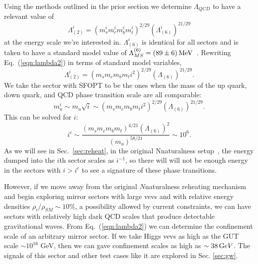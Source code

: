 \documentclass[nofootinbib,twocolumn,preprintnumbers]{revtex4-1}
\begin{document}
Using the methods outlined in the prior section we determine $\Lambda_{QCD}$ to have a relevant value of 
\begin{equation}\label{eqn:lambda2}
\Lambda^i_{(2)} = (m_s^i m_c^i m_b^i m_t^i)^{2/29}(\Lambda^i_{(6)})^{21/29}
\end{equation} 
at the energy scale we're interested in. $\Lambda^i_{(6)}$ is identical for all sectors and is taken to have a standard model value of $\Lambda^{(6)}_{MS} =(89 \pm 6)\, {\rm MeV}$~\cite{PhysRevD.98.030001}. Rewriting Eq.~(\ref{eqn:lambda2}) in terms of standard model variables, 
\begin{equation}\label{eqn:lambda2adj}
\Lambda^i_{(2)} = (m_s m_c m_b m_t i^2)^{2/29}(\Lambda_{(6)})^{21/29}.
\end{equation}
We take the sector with SFOPT to be the ones when the mass of the up quark, down quark, and QCD phase transition scale are all comparable:
\begin{equation}
m^i_u \sim m_u \sqrt{i} \sim (m_s m_c m_b m_t i^2)^{2/29}(\Lambda_{(6)})^{21/29}.
\end{equation}
This can be solved for $i$:
\begin{equation}\label{eqn:critIndex}
i^c \sim \frac{(m_s m_c m_b m_t)^{4/21}(\Lambda_{(6)})^{2}}{( m_u)^{58/21}} \sim 10^6.
\end{equation}
As we will see in Sec.~\ref{sec:reheat}, in the original Nnaturalness setup~\cite{Arkani-Hamed:2016rle}, the energy dumped into the $i$th sector scales as $i^{-1}$, so there will will not be enough energy in the sectors with $i>i^c$ to see a signature of these phase transitions. 



However, if we move away from the original $N$naturalness reheating mechanism and begin exploring mirror sectors with large vevs and with relative energy densities $\rho_i / \rho_{SM} \sim 10\%$, a possibility allowed by current constraints, we can have sectors with relatively high dark QCD scales that produce detectable gravitational waves. From Eq.~(\ref{eqn:lambda2}) we can determine the confinement scale of an arbitrary mirror sector. If we take Higgs vevs as high as the GUT scale $\sim 10^{16}$ GeV, then we can gave confinement scales as high as $\sim 38 \,{\mathrm GeV}$.  The signals of this sector and other test cases like it are explored in Sec. \ref{sec:gw}. 
\end{document}
